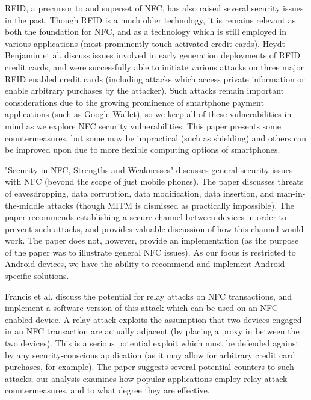 \documentclass[12pt]{article}
\begin{document}
RFID, a precursor to and superset of NFC, has also raised several security issues in the past.
Though RFID is a much older technology, it is remains relevant as both the foundation for NFC, and as a technology which is still employed in various applications (most prominently touch-activated credit cards).
Heydt-Benjamin et al.\cite{heydtbenjamin2007} discuss issues involved in early generation deployments of RFID credit cards, and were successfully able to initiate various attacks on three major RFID enabled credit cards (including attacks which access private information or enable arbitrary purchases by the attacker).
Such attacks remain important considerations due to the growing prominence of smartphone payment applications  (such as Google Wallet), so we keep all of these vulnerabilities in mind as we explore NFC security vulnerabilities.
This paper presents some countermeasures, but some may be impractical (such as shielding) and others can be improved upon due to more flexible computing options of smartphones.

"Security in NFC, Strengths and Weaknesses"\cite{haselsteiner2006} discusses general security issues with NFC (beyond the scope of just mobile phones). The paper discusses threats of eavesdropping, data corruption, data modification, data insertion, and man-in-the-middle attacks (though MITM is dismissed as practically impossible). The paper recommends establishing a secure channel between devices in order to prevent such attacks, and provides valuable discussion of how this channel would work. The paper does not, however, provide an implementation (as the purpose of the paper was to illustrate general NFC issues). As our focus is restricted to Android devices, we have the ability to recommend and implement Android-specific solutions.

Francis et al.\cite{francis2012} discuss the potential for relay attacks on NFC transactions, and implement a software version of this attack which can be used on an NFC-enabled device. A relay attack exploits the assumption that two devices engaged in an NFC transaction are actually adjacent (by placing a proxy in between the two devices). This is a serious potential exploit which must be defended against by any security-conscious application (as it may allow for arbitrary credit card purchases, for example). The paper suggests several potential counters to such attacks; our analysis examines how popular applications employ relay-attack countermeasures, and to what degree they are effective.
\end{document}

